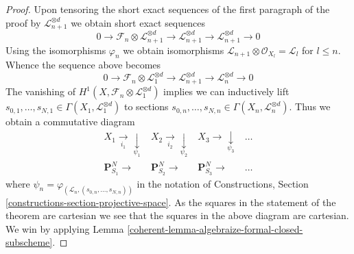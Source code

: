 \begin{proof}
\medskip\noindent
Upon tensoring the short exact sequences of the first paragraph
of the proof
by $\mathcal{L}_{n + 1}^{\otimes d}$ we obtain short exact sequences
$$
0 \to \mathcal{F}_n \otimes \mathcal{L}_{n + 1}^{\otimes d} \to
\mathcal{L}_{n + 1}^{\otimes d} \to \mathcal{L}_{n + 1}^{\otimes d} \to 0
$$
Using the isomorphisms $\varphi_n$ we obtain isomorphisms
$\mathcal{L}_{n + 1} \otimes \mathcal{O}_{X_l} = \mathcal{L}_l$
for $l \leq n$. Whence the sequence above becomes
$$
0 \to \mathcal{F}_n \otimes \mathcal{L}_1^{\otimes d} \to
\mathcal{L}_{n + 1}^{\otimes d} \to \mathcal{L}_n^{\otimes d} \to 0
$$
The vanishing of $H^1(X, \mathcal{F}_n \otimes \mathcal{L}_1^{\otimes d})$
implies we can inductively lift
$s_{0, 1}, \ldots, s_{N, 1} \in \Gamma(X_1, \mathcal{L}_1^{\otimes d})$
to sections
$s_{0, n}, \ldots, s_{N, n} \in \Gamma(X_n, \mathcal{L}_n^{\otimes d})$.
Thus we obtain a commutative diagram
$$
\begin{array}{cccc}X_1 \underset{i_1}{\longrightarrow}\underset{\psi_1}{\downarrow} & X_2 \underset{i_2}{\longrightarrow}\underset{\psi_2}{\downarrow} & X_3 \longrightarrow\underset{\psi_3}{\downarrow} & \ldots \\ \mathbf{P}^N_{S_1} \longrightarrow & \mathbf{P}^N_{S_2} \longrightarrow & \mathbf{P}^N_{S_3} \longrightarrow & \ldots\end{array}
$$
where
$\psi_n = \varphi_{(\mathcal{L}_n, (s_{0, n}, \ldots, s_{N, n}))}$
in the notation of Constructions, Section
\ref{constructions-section-projective-space}.
As the squares in the statement of the theorem are cartesian
we see that the squares in the above diagram are cartesian.
We win by applying Lemma \ref{coherent-lemma-algebraize-formal-closed-subscheme}.
\end{proof}



